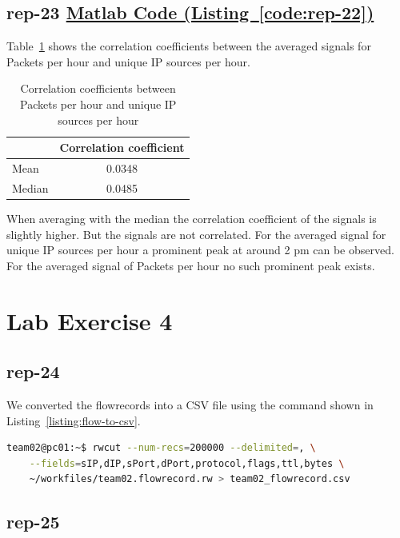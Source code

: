 \documentclass{article}
\newcommand{\codelink}[1]{%
    \hyperref[#1]{\quad\faArrowCircleRight\enskip Matlab Code (Listing~\ref{#1})}%
}
\begin{document}
\subsection{rep-23 \codelink{code:rep-22}} %

Table~\ref{table:rep-23} shows the correlation coefficients between the averaged signals for
Packets per hour and unique IP sources per hour.

\begin{table}[H]
    \centering
    \begin{tabular}{l|c}
        & Correlation coefficient \\
        \hline
        Mean & 0.0348 \\
        Median & 0.0485 \\
    \end{tabular}
    \caption{\label{table:rep-23} Correlation coefficients between Packets per hour and
    unique IP sources per hour}
\end{table}

When averaging with the median the correlation coefficient of the signals is slightly higher.
But the signals are not correlated. For the averaged signal for unique IP sources per hour
a prominent peak at around 2 pm can be observed. For the averaged signal of Packets per hour no
such prominent peak exists.

\FloatBarrier
\section{Lab Exercise 4}

\subsection{rep-24}

We converted the flowrecords into a CSV file using the command shown in Listing~\ref{listing:flow-to-csv}.

\begin{lstlisting}[label=listing:flow-to-csv,language=bash,caption={Command used to obtain CSV file}]
team02@pc01:~$ rwcut --num-recs=200000 --delimited=, \
    --fields=sIP,dIP,sPort,dPort,protocol,flags,ttl,bytes \
    ~/workfiles/team02.flowrecord.rw > team02_flowrecord.csv
\end{lstlisting}

\subsection{rep-25}
\end{document}
